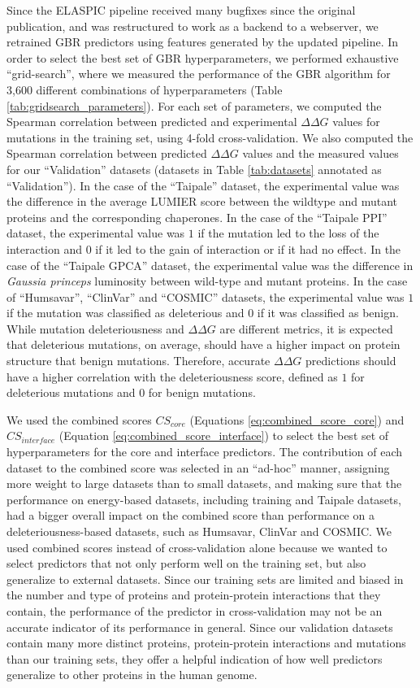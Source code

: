 Since the ELASPIC pipeline received many bugfixes since the original publication, and was restructured to work as a backend to a webserver, we retrained GBR predictors using features generated by the updated pipeline. In order to select the best set of GBR hyperparameters, we performed exhaustive ``grid-search'', where we measured the performance of the GBR algorithm for 3,600 different combinations of hyperparameters (Table \ref{tab:gridsearch_parameters}). For each set of parameters, we computed the Spearman correlation between predicted and experimental $\Delta \Delta G$ values for mutations in the training set, using 4-fold cross-validation. We also computed the Spearman correlation between predicted $\Delta \Delta G$ values and the measured values for our ``Validation'' datasets (datasets in Table \ref{tab:datasets} annotated as ``Validation''). In the case of the ``Taipale'' dataset, the experimental value was the difference in the average LUMIER score between the wildtype and mutant proteins and the corresponding chaperones. In the case of the ``Taipale PPI'' dataset, the experimental value was $1$ if the mutation led to the loss of the interaction and $0$ if it led to the gain of interaction or if it had no effect. In the case of the ``Taipale GPCA'' dataset, the experimental value was the difference in \textit{Gaussia princeps} luminosity between wild-type and mutant proteins. In the case of ``Humsavar'', ``ClinVar'' and ``COSMIC'' datasets, the experimental value was $1$ if the mutation was classified as deleterious and $0$ if it was classified as benign. While mutation deleteriousness and $\Delta \Delta G$ are different metrics, it is expected that deleterious mutations, on average, should have a higher impact on protein structure that benign mutations. Therefore, accurate $\Delta \Delta G$ predictions should have a higher correlation with the deleteriousness score, defined as $1$ for deleterious mutations and $0$ for benign mutations.

We used the combined scores $CS_{core}$ (Equations \ref{eq:combined_score_core}) and $CS_{interface}$ (Equation \ref{eq:combined_score_interface}) to select the best set of hyperparameters for the core and interface predictors. The contribution of each dataset to the combined score was selected in an ``ad-hoc'' manner, assigning more weight to large datasets than to small datasets, and making sure that the performance on energy-based datasets, including training and Taipale datasets, had a bigger overall impact on the combined score than performance on a deleteriousness-based datasets, such as Humsavar, ClinVar and COSMIC. We used combined scores instead of cross-validation alone because we wanted to select predictors that not only perform well on the training set, but also generalize to external datasets. Since our training sets are limited and biased in the number and type of proteins and protein-protein interactions that they contain, the performance of the predictor in cross-validation may not be an accurate indicator of its performance in general. Since our validation datasets contain many more distinct proteins, protein-protein interactions and mutations than our training sets, they offer a helpful indication of how well predictors generalize to other proteins in the human genome.

